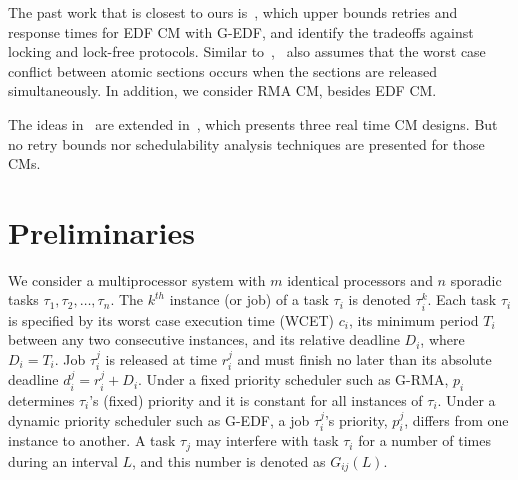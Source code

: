 \documentclass[a4paper,english]{article}
\begin{document}
The past work that is closest to ours is~\cite{key-1}, which upper bounds retries and response times for  EDF CM with G-EDF, and identify the tradeoffs against locking and lock-free protocols. Similar to~\cite{schoeberl2010rttm},~\cite{key-1} also assumes that the worst case conflict between atomic sections occurs when the sections are released simultaneously. 
In addition, we consider RMA CM, besides EDF CM.

The ideas in~\cite{key-1} are extended in~\cite{barrosmanaging}, which presents three real time CM designs. But no retry bounds nor schedulability analysis techniques are presented for those CMs. 


\section{Preliminaries}
\label{sec:model}

We consider a multiprocessor system with $m$ identical processors and $n$ sporadic tasks $\tau_1, \tau_2,\ldots, \tau_n$. The $k^{th}$ instance (or job) of a task $\tau_i$ is denoted $\tau_i^k$. Each task $\tau_i$ is specified by its worst case execution time (WCET) $c_i$, its minimum period $T_i$ between any two consecutive instances, and its relative deadline $D_i$, where $D_i=T_i$. Job $\tau_i^j$ is released at time $r_i^j$ and must finish no later than its absolute deadline $d_i^j=r_i^j+D_i$. Under a fixed priority scheduler such as G-RMA, $p_i$ determines $\tau_i$'s (fixed) priority and it is constant for all instances of $\tau_i$. Under a dynamic priority scheduler such as G-EDF, a job $\tau_i^j$'s priority, $p_i^j$, differs from one instance to another. 
A task $\tau_j$ may interfere with task $\tau_i$ for a number of times during an interval $L$, and this number is denoted as $G_{ij}(L)$. 
\end{document}
